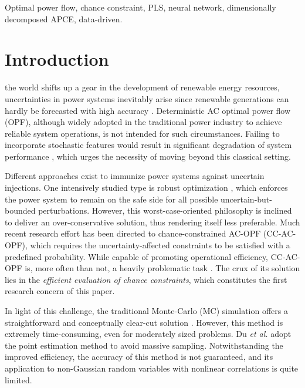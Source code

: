 \documentclass[journal]{IEEEtran}
\theoremstyle{definition}
\theoremstyle{remark}
\begin{document}
\begin{IEEEkeywords}
Optimal power flow, chance constraint, PLS, neural network, dimensionally decomposed APCE, data-driven.
\end{IEEEkeywords}

\IEEEpeerreviewmaketitle



\section{Introduction}\label{introduction}
 the world shifts up a gear in the development of renewable energy resources, uncertainties in power systems inevitably arise since renewable generations can hardly be forecasted with high accuracy \cite{kirby2017analyzing}.
Deterministic AC optimal power flow (OPF), although widely adopted in the traditional power industry to achieve reliable system operations, is not intended for such circumstances. Failing to incorporate stochastic features would result in significant degradation of system performance \cite{wang2017efficient}, which urges the necessity of moving beyond this classical setting.  

Different approaches exist to immunize power systems against uncertain injections. One intensively studied type is robust optimization \cite{qiu2020historical}, which enforces the power system to remain on the safe side for all possible uncertain-but-bounded perturbations. However, this worst-case-oriented philosophy is inclined to deliver an over-conservative solution, thus rendering itself less preferable. Much recent research effort has been directed to chance-constrained AC-OPF (CC-AC-OPF), which requires the uncertainty-affected constraints to be satisfied with a predefined probability. While capable of promoting operational efficiency, CC-AC-OPF is, more often than not, a heavily problematic task \cite{pena2020solving}. The crux of its solution lies in the \textit{ efficient evaluation of chance constraints}, which constitutes the first research concern of this paper. 

In light of this challenge, the traditional Monte-Carlo (MC) simulation offers a straightforward and conceptually clear-cut solution \cite{zhang2010probabilistic}. However, this method is extremely time-consuming, even for moderately sized problems. Du \textit{et al.} \cite{du2021chance} adopt the point estimation method to avoid massive sampling. Notwithstanding the improved efficiency, the accuracy of this method is not guaranteed, and its application to non-Gaussian random variables with nonlinear correlations is quite limited. 
\end{document}
